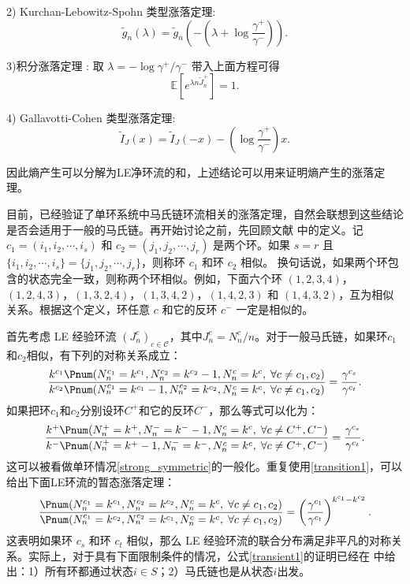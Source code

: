 2) Kurchan-Lebowitz-Spohn 类型涨落定理:
\begin{equation*}
\tilde{g}_n(\lambda)=\tilde{g}_n\left(-\left(\lambda+\log\frac{\gamma^+}{\gamma^-}\right)\right).
\end{equation*}

3)积分涨落定理 : 取 $\lambda = -\log \gamma^+/\gamma^-$ 带入上面方程可得
\begin{equation*}
\mathbb{E}\left[e^{\lambda n\tilde{J}^+_n}\right]=1.
\end{equation*}

4) Gallavotti-Cohen 类型涨落定理:
\begin{equation*}
\tilde{I}_J(x)=\tilde{I}_J(-x)-\left(\log\frac{\gamma^+}{\gamma^-}\right)x.
\end{equation*}

因此熵产生可以分解为LE净环流\cite{Seifert_2012}的和，上述结论可以用来证明熵产生的涨落定理。


目前，已经验证了单环系统中马氏链环流相关的涨落定理，自然会联想到这些结论是否会适用于一般的马氏链。再开始讨论之前，先回顾文献 \cite{jia2016cycle}中的定义。记 $c_1=(i_1,i_2,\cdots,i_s)$ 和 $c_2=(j_1,j_2,\cdots,j_r)$ 是两个环。如果 $s=r$ 且 $\{i_1,i_2,\cdots,i_s\}=\{j_1,j_2,\cdots,j_r\}$，则称环 $c_1$ 和环 $c_2$ 相似。
换句话说，如果两个环包含的状态完全一致，则称两个环相似。例如，下面六个环 $(1,2,3,4)$，$(1,2,4,3)$，$(1,3,2,4)$，$(1,3,4,2)$，$(1,4,2,3)$ 和 $(1,4,3,2)$，互为相似关系。根据这个定义，环任意 $c$ 和它的反环 $c^-$ 一定是相似的。

首先考虑 LE 经验环流 $(J^c_n)_{c\in\mathcal{C}}$，其中$J_n^c=N_n^c/n$。对于一般马氏链，如果环$c_1$和$c_2$相似，有下列的对称关系成立：
\begin{equation}\label{transient1}
    \frac{k^{c_1} \Pnum(N^{c_1}_n=k^{c_1},N^{c_2}_n=k^{c_2}-1,N^{c}_n=k^{c},\;\forall c\neq c_1,c_2)}
    {k^{c_2} \Pnum(N^{c_1}_n=k^{c_1} -1,N^{c_2}_n=k^{c_2},N^{c}_n=k^{c},\;\forall c\neq c_1,c_2)}
    = \frac{\gamma^{c_s}}{\gamma^{c_t}}.
\end{equation}
如果把环$c_1$和$c_2$分别设环$C^+$和它的反环$C^-$，那么等式可以化为：
\begin{equation*}
    \frac{k^{+} \Pnum(N^{+}_n=k^{+},N^{-}_n=k^{-}-1,N^{c}_n=k^{c},\;\forall c\neq C^+,C^-)}
    {k^{-} \Pnum(N^{+}_n=k^{+} -1,N^{-}_n=k^{-},N^{c}_n=k^{c},\;\forall c\neq C^+,C^-)}
    = \frac{\gamma^{c_s}}{\gamma^{c_t}}.
\end{equation*}
这可以被看做单环情况\ref{strong_symmetric}的一般化。重复使用\ref{transition1}，可以给出下面LE环流的暂态涨落定理：
\begin{equation}\label{transient2}
    \frac{\Pnum(N^{c_1}_n=k^{c_1},N^{c_2}_n=k^{c_2},N^{c}_n=k^{c},\;\forall c\neq c_1,c_2)}
    {\Pnum(N^{c_1}_n=k^{c_2},N^{c_2}_n=k^{c_1},N^{c}_n=k^{c},\;\forall c\neq c_1,c_2)}
    = \left(\frac{\gamma^{c_1}}{\gamma^{c_t}}\right)^{k^{c_1}-k^{c_2}}.
\end{equation}
这表明如果环 $c_s$ 和环 $c_t$ 相似，那么 LE 经验环流的联合分布满足非平凡的对称关系。实际上，对于具有下面限制条件的情况，公式\ref{transient1}的证明已经在 \cite{jia2016cycle}中给出：1）所有环都通过状态$i\in S$；2）马氏链也是从状态$i$出发。


